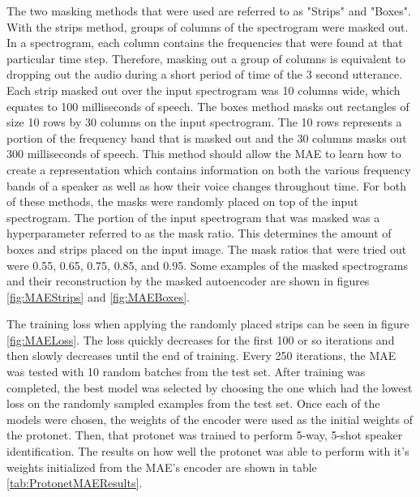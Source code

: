 \documentclass{article}
\begin{document}
The two masking methods that were used are referred to as "Strips" and "Boxes". With the strips method, groups of columns
of the spectrogram were masked out. In a spectrogram, each column contains the frequencies that were found at that particular
time step. Therefore, masking out a group of columns is equivalent to dropping out the audio during a short period of time
of the 3 second utterance. Each strip masked out over the input spectrogram was 10 columns wide, which equates to 100 milliseconds
of speech. The boxes method masks out rectangles of size 10 rows by 30 columns on the input spectrogram. The 10 rows represents
a portion of the frequency band that is masked out and the 30 columns masks out 300 milliseconds of speech. This method
should allow the MAE to learn how to create a representation which contains information on both the various frequency
bands of a speaker as well as how their voice changes throughout time. For both of these methods, the masks were randomly
placed on top of the input spectrogram. The portion of the input spectrogram that was masked was a hyperparameter referred to
as the mask ratio. This determines the amount of boxes and strips placed on the input image. The mask ratios that were 
tried out were 0.55, 0.65, 0.75, 0.85, and 0.95. Some examples of the masked spectrograms and their reconstruction by
the masked autoencoder are shown in figures \ref{fig:MAEStrips} and \ref{fig:MAEBoxes}.

The training loss when applying the randomly placed strips can be seen in figure \ref{fig:MAELoss}. The loss quickly decreases
for the first 100 or so iterations and then slowly decreases until the end of training. Every 250 iterations, the MAE
was tested with 10 random batches from the test set. After training was completed, the best model was selected by choosing
the one which had the lowest loss on the randomly sampled examples from the test set. Once each of the models were chosen,
the weights of the encoder were used as the initial weights of the protonet. Then, that protonet was trained to perform 
5-way, 5-shot speaker identification. The results on how well the protonet was able to perform with it's weights initialized
from the MAE's encoder are shown in table \ref{tab:ProtonetMAEResults}.
\end{document}
